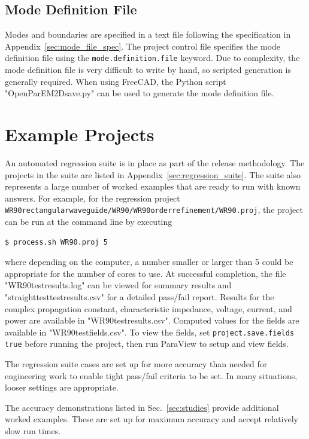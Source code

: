 \documentclass[titlepage]{article}
\renewcommand\_{\textunderscore\linebreak[1]}
\begin{document}
\subsection{Mode Definition File}
\label{sec:mode_definition_file}

Modes and boundaries are specified in a text file following the specification in Appendix~\ref{sec:mode_file_spec}.  The project control file specifies the mode definition file using the \texttt{mode.definition.file} keyword. Due to complexity, the mode definition file is very difficult to write by hand, so scripted generation is generally required.  When using FreeCAD, the Python script "OpenParEM2D\_save.py" can be used to generate the mode definition file.


\section{Example Projects}

An automated regression suite is in place as part of the release methodology. The projects in the suite are listed in Appendix~\ref{sec:regression_suite}.  The suite also represents a large number of worked examples that are ready to run with known answers.  For example, for the regression project \texttt{WR90\_rectangular\_waveguide/WR90/WR90\_order\_4\_refinement/WR90.proj}, the project can be run at the command line by executing
\begin{Verbatim}[fontsize=\small]
   $ process.sh WR90.proj 5
\end{Verbatim}
where depending on the computer, a number smaller or larger than 5 could be appropriate for the number of cores to use.  At successful completion, the file "WR90\_test\_results.log" can be viewed for summary results and "straight\_test\_test\_results.csv" for a detailed pass/fail report.  Results for the complex propagation constant, characteristic impedance, voltage, current, and power are available in "WR90\_test\_results.csv".  Computed values for the fields are available in "WR90\_test\_fields.csv".  To view the fields, set \verb+project.save.fields true+ before running the project, then run ParaView to setup and view fields.

The regression suite cases are set up for more accuracy than needed for engineering work to enable tight pass/fail criteria to be set.  In many situations, looser settings are appropriate.

The accuracy demonstrations listed in Sec.~\ref{sec:studies} provide additional worked examples.  These are set up for maximum accuracy and accept relatively slow run times.
\end{document}
